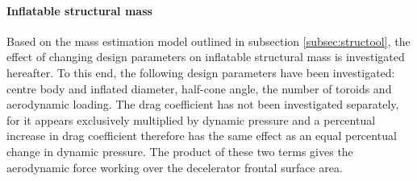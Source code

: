 \paragraph{Inflatable structural mass}

Based on the mass estimation model outlined in subsection \ref{subsec:structool}, the effect of changing design parameters on inflatable structural mass is investigated hereafter. To this end, the following design parameters have been investigated: centre body and inflated diameter, half-cone angle, the number of toroids and aerodynamic loading. The drag coefficient has not been investigated separately, for it appears exclusively multiplied by dynamic pressure and a percentual increase in drag coefficient therefore has the same effect as an equal percentual change in dynamic pressure. The product of these two terms gives the aerodynamic force working over the decelerator frontal surface area.

